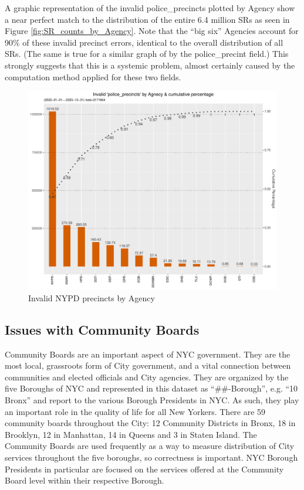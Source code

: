 \documentclass[12pt, titlepage]{article}
\begin{document}
{	A graphic representation of the invalid police\_precincts plotted 
	by Agency show a near perfect match to the distribution of the 
	entire 6.4 million SRs as seen in Figure \ref{fig:SR_counts_by_Agency}. 
	Note that the ``big six'' Agencies account for 90\% of these invalid 
	precinct errors, identical to the overall distribution of all SRs. 
	(The same is true for a similar graph of by the police\_precint field.) 
	This strongly suggests that this is a systemic problem, 
	almost certainly caused by the computation method applied for these two fields.
	 
	\begin{figure}[tbp]
	  \centering
	  \includegraphics[width=\textwidth]{invalid_police_precincts.pdf}
	  \caption{Invalid NYPD precincts by Agency}	  
	  \label{fig:invalid_police_precincts_zip}
	\end{figure}

	\subsection{Issues with Community Boards}
	Community Boards are an important aspect of NYC government. They are the 
	most local, grassroots form of City government, and a vital connection 
	between communities and elected officials and City agencies. 
	They are organized by the five Boroughs of NYC and represented	
	in this dataset as ``\#\#-Borough'', e.g. ``10 Bronx'' and report to the 
	various Borough Presidents in NYC. As such, they play an important 
	role in the quality of life for all New Yorkers. There are 59 community 
	boards throughout the City: 12 Community Districts in Bronx, 18 in Brooklyn, 
	12 in Manhattan, 14 in Queens and 3 in Staten Island. The Community 
	Boards are used frequently as a way to measure distribution of 
	City services throughout the five boroughs, so correctness is important. 
	NYC Borough Presidents in particular are focused on the services 
	offered at the Community Board level within their respective Borough.
	
}
\end{document}
